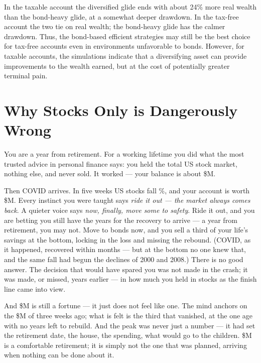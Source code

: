 \documentclass[11pt]{article}
\begin{document}
\medskip

\noindent In the taxable account the diversified glide ends with about 24\% more real wealth than
the bond-heavy glide, at a somewhat deeper drawdown. In the tax-free account the two tie on real
wealth; the bond-heavy glide has the calmer drawdown. Thus, the bond-based efficient strategies
may still be the best choice for tax-free accounts even in environments unfavorable to bonds.
However, for taxable accounts, the simulations indicate that a diversifying asset can provide
improvements to the wealth earned, but at the cost of potentially greater terminal pain.

\section{Why Stocks Only is Dangerously Wrong}\label{sec:concentration}

\begin{tcolorbox}[breakable, colback=blue!4!white, colframe=blue!50!black,
  title=\textbf{A scenario: one year from retirement, March 2020}]
You are a year from retirement. For a working lifetime you did what the most trusted advice in personal
finance says: you held the total US stock market, nothing else, and never sold. It worked --- your
balance is about \$\StockOnlyWealth M.

Then COVID arrives. In five weeks US stocks fall \CovidDD\%, and your account is worth \$\StockOnlyCovid M.
Every instinct you were taught says \emph{ride it out --- the market always comes back}. A quieter voice
says \emph{now, finally, move some to safety}. Ride it out, and you are betting you still have the years
for the recovery to arrive --- a year from retirement, you may not. Move to bonds now, and you sell a
third of your life's savings at the bottom, locking in the loss and missing the rebound. (COVID, as it
happened, recovered within months --- but at the bottom no one knew that, and the same fall had begun
the declines of 2000 and 2008.) There is no good answer. The decision that would have spared you was not
made in the crash; it was made, or missed, years earlier --- in how much you held in stocks as the
finish line came into view.

And \$\StockOnlyCovid M is still a fortune --- it just does not feel like one. The mind anchors on the
\$\StockOnlyWealth M of three weeks ago; what is felt is the third that vanished, at the one age with no
years left to rebuild. And the peak was never just a number --- it had set the retirement date, the
house, the spending, what would go to the children. \$\StockOnlyCovid M is a comfortable retirement; it
is simply not the one that was planned, arriving when nothing can be done about it.
\end{tcolorbox}
\end{document}

